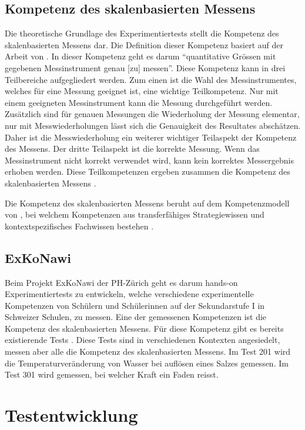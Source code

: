 
\subsection{Kompetenz des skalenbasierten Messens}

Die theoretische Grundlage des Experimentiertests stellt die Kompetenz des skalenbasierten Messens dar. Die Definition dieser Kompetenz basiert auf der Arbeit von \citet{Munier2013}. In dieser Kompetenz geht es darum  "`quantitative Grössen mit gegebenen Messinstrument genau [zu] messen"'\citep{Gut2013a}. Diese Kompetenz kann in drei Teilbereiche aufgegliedert werden. Zum einen ist die Wahl des Messinstrumentes, welches für eine Messung geeignet ist, eine wichtige Teilkompetenz. Nur mit einem geeigneten Messinstrument kann die Messung durchgeführt werden. Zusätzlich sind für genauen Messungen die Wiederholung der Messung elementar, nur mit Messwiederholungen lässt sich die Genauigkeit des Resultates abschätzen. Daher ist die Messwiederholung ein weiterer wichtiger Teilaspekt der Kompetenz des Messens. Der dritte Teilaspekt ist die korrekte Messung. Wenn das Messinstrument nicht korrekt verwendet wird, kann kein korrektes Messergebnis erhoben werden. Diese Teilkompetenzen ergeben zusammen die Kompetenz des skalenbasierten Messens \citep{Munier2013,Gut2013a}.

Die Kompetenz des skalenbasierten Messens beruht auf dem Kompetenzmodell von \citet{Gott1996}, bei welchem Kompetenzen aus transferfähiges Strategiewissen und kontextspezifisches Fachwissen bestehen \citet{Gott2002}.

\subsection{ExKoNawi}

Beim Projekt ExKoNawi der PH-Zürich \citep{Metzger2013} geht es darum hands-on Experimentiertests zu entwickeln, welche verschiedene experimentelle Kompetenzen von Schülern und Schülerinnen auf der Sekundarstufe I in Schweizer Schulen, zu messen. Eine der gemessenen Kompetenzen ist die Kompetenz des skalenbasierten Messens. Für diese Kompetenz gibt es bereits existierende Tests \citep{Metzger2013, Gut2013a, Hild2014a, Hild2014}. Diese Tests sind in verschiedenen Kontexten angesiedelt, messen aber alle die Kompetenz des skalenbasierten Messens. Im Test 201 wird die Temperaturveränderung von Wasser bei auflösen eines Salzes gemessen. Im Test 301 wird gemessen, bei welcher Kraft ein Faden reisst.


\section{Testentwicklung}

